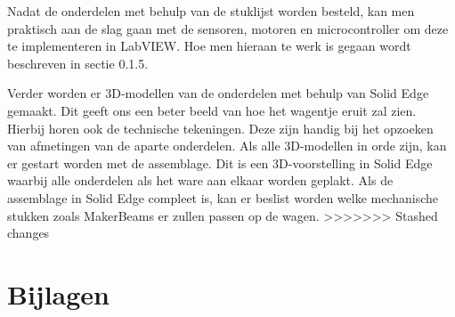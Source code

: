 \documentclass[a4paper,twoside,kulak]{kulakreport} %
\begin{document}
Nadat de onderdelen met behulp van de stuklijst worden besteld, kan men praktisch aan de slag gaan met de sensoren, motoren en microcontroller om deze te implementeren in LabVIEW. Hoe men hieraan te werk is gegaan wordt beschreven in sectie 0.1.5.

Verder worden er 3D-modellen van de onderdelen met behulp van Solid Edge gemaakt. Dit geeft ons een beter beeld van hoe het wagentje eruit zal zien. Hierbij horen ook de technische tekeningen. Deze zijn handig bij het opzoeken van afmetingen van de aparte onderdelen. Als alle 3D-modellen in orde zijn, kan er gestart worden met de assemblage. Dit is een 3D-voorstelling in Solid Edge waarbij alle onderdelen als het ware aan elkaar worden geplakt. Als de assemblage in Solid Edge compleet is, kan er beslist worden welke mechanische stukken zoals MakerBeams er zullen passen op de wagen.
\label{Planning}
>>>>>>> Stashed changes


\newpage

\section{Bijlagen}
\label{financieel rapport}






\end{document}
